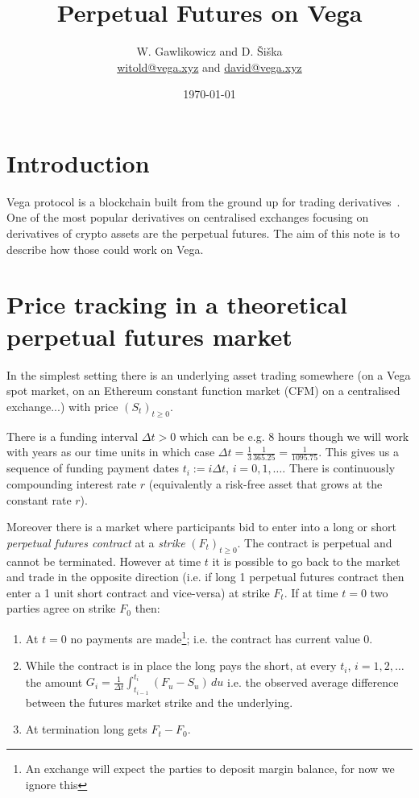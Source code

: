 \documentclass[10pt]{article}
\author{W. Gawlikowicz and D. \v{S}i\v{s}ka\\
\small{\href{witold@vega.xyz}{witold@vega.xyz} and \href{david@vega.xyz}{david@vega.xyz}}}
\title{Perpetual Futures on Vega}
\date{
    \vspace{2em}
    \today\\
    \vspace{0.5em}
    {\footnotesize }
    \vspace{2em}
}
\begin{document}
\thispagestyle{empty} %
\pagestyle{plain}
\lhead[{}{}]       {{}{}}
\rhead[{}{}]       {{}{}}

\maketitle
\pagebreak

\pagebreak

\tableofcontents
\pagebreak


\pagestyle{fancyplain}
\rhead{\rightmark}
\cfoot{\thepage}


\section{Introduction}
Vega protocol is a blockchain built from the ground up for trading derivatives~\cite{vega whitepaper}.
One of the most popular derivatives on centralised exchanges focusing on derivatives of crypto assets are the perpetual futures. 
The aim of this note is to describe how those could work on Vega. 

\section{Price tracking in a theoretical perpetual futures market}

In the simplest setting there is an underlying asset trading somewhere (on a Vega spot market, on an Ethereum constant function market (CFM) on a centralised exchange...) with price $(S_t)_{t\geq 0}$. 

There is a funding interval $\Delta t > 0$ which can be e.g. $8$ hours though we will work with years as our time units in which case $\Delta t = \frac13 \frac1{365.25} = \frac1{1095.75}$.
This gives us a sequence of funding payment dates $t_i := i\Delta t$, $i=0,1,\ldots$.
There is continuously compounding interest rate $r$ (equivalently a risk-free asset that grows at the constant rate $r$).

Moreover there is a market where participants bid to enter into a long or short {\em perpetual futures contract} at a {\em strike} $(F_t)_{t\geq 0}$.  
The contract is perpetual and cannot be terminated. 
However at time $t$ it is possible to go back to the market and trade in the opposite direction (i.e. if long 1 perpetual futures contract then enter a 1 unit short contract and vice-versa) at strike $F_t$.   
If at time $t=0$ two parties agree on strike $F_0$ then:
\begin{enumerate}
\item At $t=0$ no payments are made\footnote{An exchange will expect the parties to deposit margin balance, for now we ignore this}; i.e. the contract has current value $0$.
\item While the contract is in place the long pays the short, at every $t_i$, $i=1,2,\ldots$ the amount $G_i = \frac1{\Delta t}\int_{t_{i-1}}^{t_i} (F_u - S_u) \,du $ i.e. the observed average difference  between the futures market strike and the underlying. 
\item At termination long gets $F_t - F_0$. 
\end{enumerate}  
\end{document}
